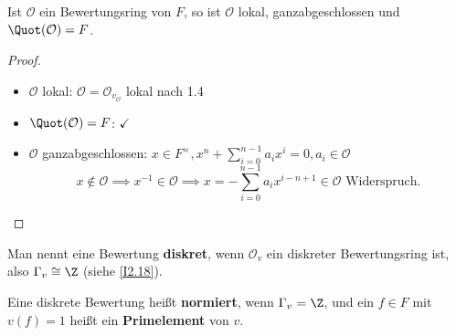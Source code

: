 \begin{korollar}
    Ist $\mathcal{O}$ ein Bewertungsring von $F$, so ist $\mathcal{O}$ lokal, ganzabgeschlossen und $\Quot(\mathcal{O}) = F$.
\end{korollar}
\begin{proof}
    \begin{itemize}
        \item $\mathcal{O}$ lokal: $\mathcal{O} = \mathcal{O}_{v_\mathcal{O}}$ lokal nach 1.4
        \item $\Quot(\mathcal{O}) = F$: $\checkmark$
        \item $\mathcal{O}$ ganzabgeschlossen: $x \in F^\times, x^n + \sum\limits_{i=0}^{n-1}a_i x^i = 0, a_i \in \mathcal{O}$
        $$x \notin \mathcal{O} \implies x^{-1} \in \mathcal{O} \implies x = - \sum\limits_{i=0}^{n-1}a_i x^{i - n +1} \in \mathcal{O} 
        \text{ Widerspruch.}$$
    \end{itemize}
\end{proof}

\begin{bemerkungnr}
    Man nennt eine Bewertung \textbf{diskret}, wenn $\mathcal{O}_v$ ein diskreter Bewertungsring ist, also 
    $\Gamma_v \cong \Z$ (siehe \cref{I2.18}).

    Eine diskrete Bewertung heißt \textbf{normiert}, wenn $\Gamma_v = \Z$, und ein $f \in F$ mit $v(f) = 1$ heißt
    ein \textbf{Primelement} von $v$.
\end{bemerkungnr}

